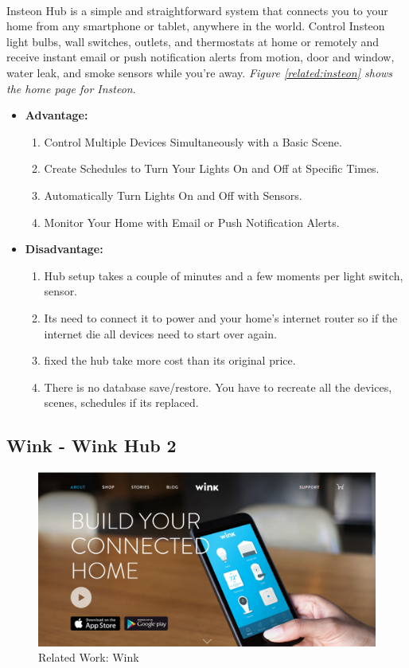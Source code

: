 \documentclass[12pt, oneside, a4paper]{book}
\newcommand\boldcolor[1]{\textcolor{bold}{\textbf{#1}}}
\begin{document}
		\paragraph{}Insteon Hub is a simple and straightforward system that connects you to your home from any smartphone or tablet, anywhere in the world. Control Insteon light bulbs, wall switches, outlets, and thermostats at home or remotely and receive instant email or push notification alerts from motion, door and window, water leak, and smoke sensors while you’re away\cite{insteon}. \textit{Figure \ref{related:insteon} shows the home page for Insteon}.
		\begin{itemize}
		\item \boldcolor{Advantage:}
			\begin{enumerate}
				\item Control Multiple Devices Simultaneously with a Basic Scene.
				\item Create Schedules to Turn Your Lights On and Off at Specific Times.
				\item Automatically Turn Lights On and Off with Sensors.
				\item Monitor Your Home with Email or Push Notification Alerts.
			\end{enumerate}
		\item \boldcolor{Disadvantage:} 
			\begin{enumerate}
				\item Hub setup takes a couple of minutes and a few moments per light switch, sensor.
				\item Its need to connect it to power and your home's internet router so if the internet die all devices need to start over again. 
				\item fixed the hub take more cost than its original price.
				\item There is no database save/restore. You have to recreate all the devices, scenes, schedules if its replaced.
			\end{enumerate}
		\end{itemize}
		\newpage	
		\subsection{Wink - Wink Hub 2}
		\begin{figure}[H]
  			\includegraphics[width=\linewidth]{img/wink.png}
  			\caption{Related Work: Wink}
  			\label{related:wink}
		\end{figure}
\end{document}
